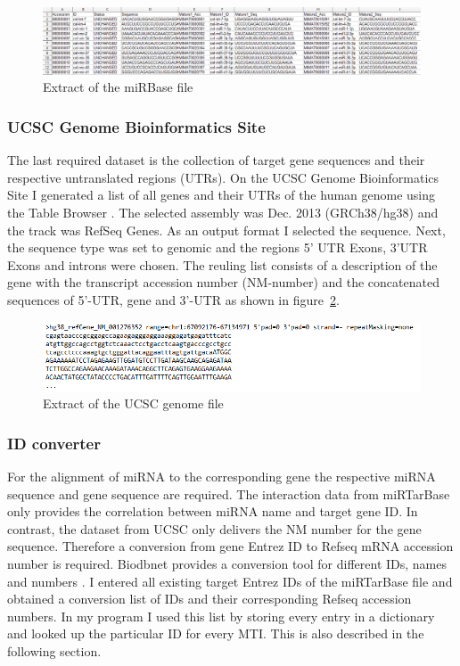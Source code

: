 \documentclass[12pt]{article}
\begin{document}
\begin{figure}[h]
\centering
\includegraphics[width=\textwidth]{results/mirbase.png}
\caption{Extract of the miRBase file}
\label{mirbase_scrot}
\end{figure}


\vspace{0.5cm}

 
\subsubsection{UCSC Genome Bioinformatics Site}
The last required dataset is the collection of target gene sequences and their respective untranslated regions (UTRs). On the UCSC Genome Bioinformatics Site I generated a list of all genes and their UTRs of the human genome using the Table Browser \cite{ucsc}. The selected assembly was Dec. 2013 (GRCh38/hg38) and the track was RefSeq Genes. As an output format I selected the sequence. Next, the sequence type was set to genomic and the regions 5' UTR Exons, 3'UTR Exons and introns were chosen. The reuling list consists of a description of the gene with the transcript accession number (NM-number) and the concatenated sequences of 5'-UTR, gene and 3'-UTR as shown in figure~\ref{ucsc_scrot}.\\


\begin{figure}[h]
\centering
\includegraphics[width=\textwidth]{results/ucsc.png}
\caption{Extract of the UCSC genome file}
\label{ucsc_scrot}
\end{figure}



\subsubsection{ID converter}
\label{sec:id}
For the alignment of miRNA to the corresponding gene the respective miRNA sequence and gene sequence are required. The interaction data from miRTarBase only provides the correlation between miRNA name and target gene ID. In contrast, the dataset from UCSC only delivers the NM number for the gene sequence. Therefore a conversion from gene Entrez ID to Refseq mRNA accession number is required. Biodbnet provides a conversion tool for different IDs, names and numbers \cite{biodb}. I entered all existing target Entrez IDs of the miRTarBase file and obtained a conversion list of IDs and their corresponding Refseq accession numbers. In my program I used this list by storing every entry in a dictionary and looked up the particular ID for every MTI. This is also described in the following section.
 
\end{document}
